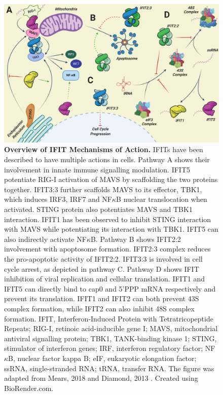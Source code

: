 \begin{figure}
    \centering
    \includegraphics[width=1\linewidth]{04. Introduction//Figs/06. IFIT Mechanism of Action.png}
    \caption[Overview of IFIT Mechanisms of Action.]{\textbf{Overview of IFIT Mechanisms of Action.} IFITs have been described to have multiple actions in cells. Pathway A shows their involvement in innate immune signalling modulation. IFIT5 potentiate RIG-I activation of MAVS by scaffolding the two proteins together. IFIT3:3 further scaffolds MAVS to its effector, TBK1, which induces IRF3, IRF7 and NF\(\kappa\)B nuclear translocation when activated. STING protein also potentiates MAVS and TBK1 interaction. IFIT1 has been observed to inhibit STING interaction with MAVS while potentiating its interaction with TBK1. IFIT5 can also indirectly activate NF\(\kappa\)B. Pathway B shows IFIT2:2 involvement with apoptosome formation. IFIT2:3 complex reduces the pro-apoptotic activity of IFIT2:2. IFIT3:3 is involved in cell cycle arrest, as depicted in pathway C. Pathway D shows IFIT inhibition of viral replication and cellular translation. IFIT1 and IFIT5 can directly bind to cap0 and 5’PPP mRNA respectively and prevent its translation. IFIT1 and IFIT2 can both prevent 43S complex formation, while IFIT2 can also inhibit 48S complex formation. IFIT, Interferon-Induced Protein with Tetratricopeptide Repeats; RIG-I, retinoic acid-inducible gene I; MAVS, mitochondrial antiviral signalling protein; TBK1, TANK-binding kinase 1; STING, stimulator of interferon genes; IRF, interferon regulatory factor; NF\(\kappa\)B, nuclear factor kappa B; eIF, eukaryotic elongation factor; ssRNA, single-stranded RNA; tRNA, transfer RNA. The figure was adapted from Mears, 2018 \cite{Mears2018BetterResponse} and Diamond, 2013 \cite{Diamond2013TheProteins}. Created using BioRender.com.}
    \label{fig:Overview of IFIT Mechanisms of Action}
\end{figure}

